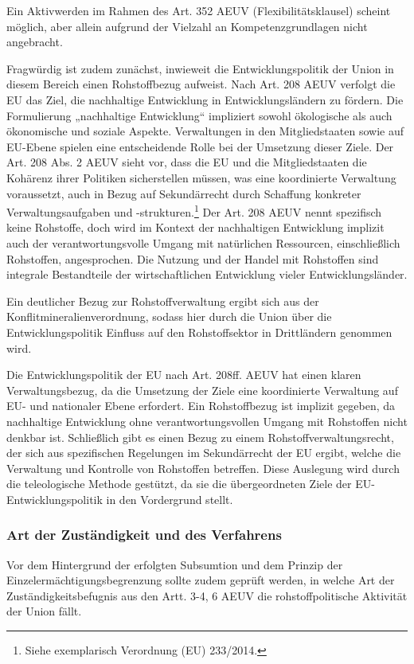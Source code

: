 \documentclass[12pt,a4paper,oneside]{book} %
\begin{document}
	Ein Aktivwerden im Rahmen des Art. 352 AEUV (\glqq Flexibilitätsklausel\grqq) scheint möglich, aber allein aufgrund der Vielzahl an Kompetenzgrundlagen nicht angebracht.
	
	Fragwürdig ist zudem zunächst, inwieweit die Entwicklungspolitik der Union in diesem Bereich einen Rohstoffbezug aufweist. Nach Art. 208 AEUV verfolgt die EU das Ziel, die nachhaltige Entwicklung in Entwicklungsländern zu fördern. Die Formulierung „nachhaltige Entwicklung“ impliziert sowohl ökologische als auch ökonomische und soziale Aspekte. Verwaltungen in den Mitgliedstaaten sowie auf EU-Ebene spielen eine entscheidende Rolle bei der Umsetzung dieser Ziele. Der Art. 208 Abs. 2 AEUV sieht vor, dass die EU und die Mitgliedstaaten die Kohärenz ihrer Politiken sicherstellen müssen, was eine koordinierte Verwaltung voraussetzt, auch in Bezug auf Sekundärrecht durch Schaffung konkreter Verwaltungsaufgaben und -strukturen.\footnote{Siehe exemplarisch Verordnung (EU) 233/2014.} Der Art. 208 AEUV nennt spezifisch keine Rohstoffe, doch wird im Kontext der nachhaltigen Entwicklung implizit auch der verantwortungsvolle Umgang mit natürlichen Ressourcen, einschließlich Rohstoffen, angesprochen. Die Nutzung und der Handel mit Rohstoffen sind integrale Bestandteile der wirtschaftlichen Entwicklung vieler Entwicklungsländer.
	
	Ein deutlicher Bezug zur Rohstoffverwaltung ergibt sich aus der Konflitmineralienverordnung, sodass hier durch die Union über die Entwicklungspolitik Einfluss auf den Rohstoffsektor in Drittländern genommen wird.
	
	Die Entwicklungspolitik der EU nach Art. 208ff. AEUV hat einen klaren Verwaltungsbezug, da die Umsetzung der Ziele eine koordinierte Verwaltung auf EU- und nationaler Ebene erfordert. Ein Rohstoffbezug ist implizit gegeben, da nachhaltige Entwicklung ohne verantwortungsvollen Umgang mit Rohstoffen nicht denkbar ist. Schließlich gibt es einen Bezug zu einem Rohstoffverwaltungsrecht, der sich aus spezifischen Regelungen im Sekundärrecht der EU ergibt, welche die Verwaltung und Kontrolle von Rohstoffen betreffen. Diese Auslegung wird durch die teleologische Methode gestützt, da sie die übergeordneten Ziele der EU-Entwicklungspolitik in den Vordergrund stellt.
	
	\subsubsection{Art der Zuständigkeit und des Verfahrens}
	Vor dem Hintergrund der erfolgten Subsumtion und dem Prinzip der Einzelermächtigungsbegrenzung sollte zudem geprüft werden, in welche Art der Zuständigkeitsbefugnis aus den Artt. 3-4, 6 AEUV die rohstoffpolitische Aktivität der Union fällt.
	
\end{document}
